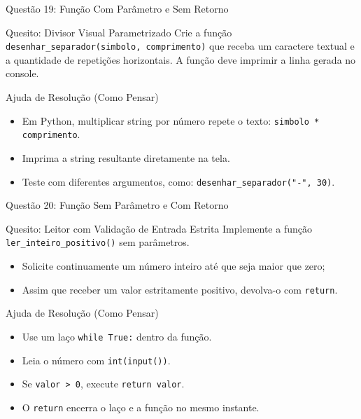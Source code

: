 \begin{frame}{Questão 19: Função Com Parâmetro e Sem Retorno}
    \begin{block}{Quesito: Divisor Visual Parametrizado}
        Crie a função \texttt{desenhar\_separador(simbolo, comprimento)} que receba um caractere textual e a quantidade de repetições horizontais. A função deve imprimir a linha gerada no console.
    \end{block}

    \begin{exampleblock}{Ajuda de Resolução (Como Pensar)}
        \begin{itemize}
            \item Em Python, multiplicar string por número repete o texto: \texttt{simbolo * comprimento}.
            \item Imprima a string resultante diretamente na tela.
            \item Teste com diferentes argumentos, como: \texttt{desenhar\_separador("-", 30)}.
        \end{itemize}
    \end{exampleblock}
\end{frame}

\begin{frame}{Questão 20: Função Sem Parâmetro e Com Retorno}
    \begin{block}{Quesito: Leitor com Validação de Entrada Estrita}
        Implemente a função \texttt{ler\_inteiro\_positivo()} sem parâmetros.
        \begin{itemize}
            \item Solicite continuamente um número inteiro até que seja maior que zero;
            \item Assim que receber um valor estritamente positivo, devolva-o com \texttt{return}.
        \end{itemize}
    \end{block}

    \begin{exampleblock}{Ajuda de Resolução (Como Pensar)}
        \begin{itemize}
            \item Use um laço \texttt{while True:} dentro da função.
            \item Leia o número com \texttt{int(input())}.
            \item Se \texttt{valor > 0}, execute \texttt{return valor}.
            \item O \texttt{return} encerra o laço e a função no mesmo instante.
        \end{itemize}
    \end{exampleblock}
\end{frame}

